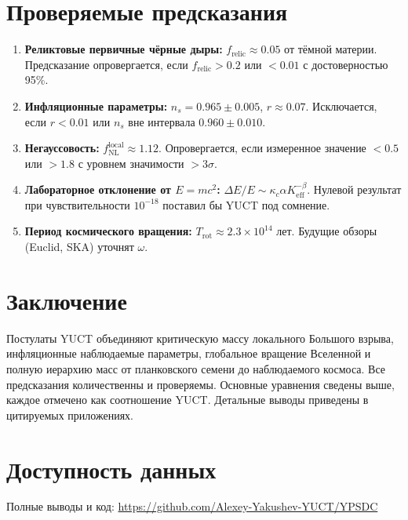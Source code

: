 \documentclass[12pt,a4paper]{article}
\begin{document}
	\section{Проверяемые предсказания}
	
	\begin{enumerate}
		\item \textbf{Реликтовые первичные чёрные дыры:} \(f_{\mathrm{relic}} \approx 0.05\) от тёмной материи. Предсказание опровергается, если \(f_{\mathrm{relic}}>0.2\) или \(<0.01\) с достоверностью 95\%.
		\item \textbf{Инфляционные параметры:} \(n_s = 0.965\pm0.005\), \(r\approx 0.07\). Исключается, если \(r<0.01\) или \(n_s\) вне интервала \(0.960\pm0.010\).
		\item \textbf{Негауссовость:} \(f_{\mathrm{NL}}^{\mathrm{local}} \approx 1.12\). Опровергается, если измеренное значение \(<0.5\) или \(>1.8\) с уровнем значимости \(>3\sigma\).
		\item \textbf{Лабораторное отклонение от \(E=mc^2\):} \(\Delta E/E \sim \kappa_c\alpha K_{\mathrm{eff}}^{-\beta}\). Нулевой результат при чувствительности \(10^{-18}\) поставил бы YUCT под сомнение.
		\item \textbf{Период космического вращения:} \(T_{\mathrm{rot}} \approx 2.3\times10^{14}\) лет. Будущие обзоры (Euclid, SKA) уточнят \(\omega\).
	\end{enumerate}
	
	\section{Заключение}
	
	Постулаты YUCT объединяют критическую массу локального Большого взрыва, инфляционные наблюдаемые параметры, глобальное вращение Вселенной и полную иерархию масс от планковского семени до наблюдаемого космоса. Все предсказания количественны и проверяемы. Основные уравнения сведены выше, каждое отмечено как соотношение YUCT. Детальные выводы приведены в цитируемых приложениях.
	
	\section*{Доступность данных}
	
	Полные выводы и код: \url{https://github.com/Alexey-Yakushev-YUCT/YPSDC}
	
\end{document}
